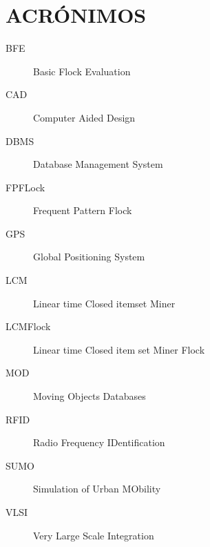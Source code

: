 \chapter*{ACRÓNIMOS}
 
\begin{description}
 \item [BFE] Basic Flock Evaluation
 \item [CAD] Computer Aided Design
 \item [DBMS] Database Management System
 \item [FPFLock] Frequent Pattern Flock
 \item [GPS] Global Positioning System
 \item [LCM] Linear time Closed itemset Miner
 \item [LCMFlock]  Linear time Closed item set Miner Flock
 \item [MOD] Moving Objects Databases
 \item [RFID] Radio Frequency IDentification
  \item [SUMO] Simulation of Urban MObility
 \item [VLSI]  Very Large Scale Integration
\end{description}
